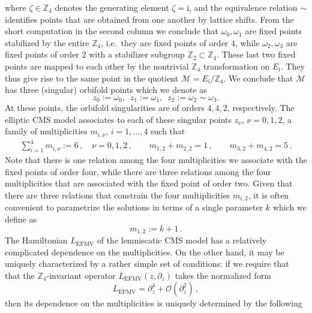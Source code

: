 \documentclass{article}
\def \om {\omega}
\def \ds {\partial}
\def \Zs {\mathbb{Z}}
\def \oo {\mathcal{O}}
\begin{document}
where $\zeta \in \mathbb{Z}_4$ denotes the generating element $\zeta = \mathrm{i}$, and the equivalence relation $\sim$ identifies 
points that are obtained from one another by lattice shifts. 
From the short computation in the second column we conclude that $\om_0,\om_1$ are fixed points stabilized by the entire $\mathbb{Z}_4$, i.e.\ they are fixed points of order $4$, while $\om_2,\om_3$ are fixed points of order $2$ with a stabilizer subgroup $\mathbb{Z}_2 \subset 
\mathbb{Z}_4$. These last two fixed points are mapped to each other by the nontrivial 
$\mathbb{Z}_4$ transformation on $E_\mathrm{i}$. They thus give rise to the same point in the 
quotient $\mathcal{M}= E_\mathrm{i}/\Zs_4$. We conclude that $\mathcal{M}$ has three (singular) 
orbifold points which we denote as 
\begin{equation}
z_0:= \om_0,\,\,\, z_1:= \om_1,\,\,\, z_2:= \om_2 \sim \om_3. 
\end{equation}
At these points, the orbifold singularities are of orders $4,4,2$, respectively. The elliptic 
CMS model associates to each of these singular points $z_{\nu}$, $\nu = 0,1,2$, a family of multiplicities $m_{i,\nu}$, $i = 1,\dots,4$ such that
\begin{align} \label{eq:mconstraint} 
\sum_{i=1}^4 m_{i,\nu} := 6 \,, \quad \nu = 0,1,2\,, \qquad m_{1,2}+m_{2,2} =1\,, \qquad   m_{3,2}+m_{4,2} = 5\,.
\end{align}
Note that there is one relation among the four multiplicities we associate with the fixed 
points of order four, while there are three relations among the four multiplicities that are 
associated with the fixed point of order two. Given that there are three relations that 
constrain the four multiplicities $m_{i,2}$, it is often convenient to parametrize the 
solutions in terms of a single parameter $k$ which we define as  
\begin{equation}
    m_{1,2} := k+1\,.
    \label{def_k}
\end{equation}
The Hamiltonian $L_{\mathrm{EFMV}}$ of the lemniscatic CMS model has a relatively 
complicated dependence on the multiplicities. On the other hand, it may be uniquely 
characterized by a rather simple set of conditions: if we require that that the $\mathbb{Z}_4$-invariant operator $L_{\mathrm{EFMV}}(z,\ds_z)$ takes the normalized form
\begin{equation}
    L_{\mathrm{EFMV}} = \ds_z^4 + \oo(\ds_z^2)\,,
    \label{L_canonical_form}
\end{equation} 
then its dependence on the multiplicities is uniquely determined by the following 
\end{document}
